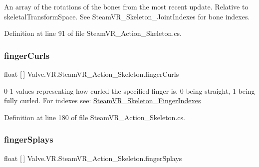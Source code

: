 An array of the rotations of the bones from the most recent update. Relative to skeletal\+Transform\+Space. See Steam\+V\+R\+\_\+\+Skeleton\+\_\+\+Joint\+Indexes for bone indexes. 



Definition at line 91 of file Steam\+V\+R\+\_\+\+Action\+\_\+\+Skeleton.\+cs.

\mbox{\label{class_valve_1_1_v_r_1_1_steam_v_r___action___skeleton_aea32ec100629c38fab02df8ad0c8437e}} 
\subsubsection{\texorpdfstring{fingerCurls}{fingerCurls}}
{\footnotesize\ttfamily float \mbox{[}$\,$\mbox{]} Valve.\+V\+R.\+Steam\+V\+R\+\_\+\+Action\+\_\+\+Skeleton.\+finger\+Curls\hspace{0.3cm}{\ttfamily [get]}}



0-\/1 values representing how curled the specified finger is. 0 being straight, 1 being fully curled. For indexes see\+: \mbox{\hyperlink{class_valve_1_1_v_r_1_1_steam_v_r___skeleton___finger_indexes}{Steam\+V\+R\+\_\+\+Skeleton\+\_\+\+Finger\+Indexes}} 



Definition at line 180 of file Steam\+V\+R\+\_\+\+Action\+\_\+\+Skeleton.\+cs.

\mbox{\label{class_valve_1_1_v_r_1_1_steam_v_r___action___skeleton_ac7eb975e0367698e976957e9f9acd8a1}} 
\subsubsection{\texorpdfstring{fingerSplays}{fingerSplays}}
{\footnotesize\ttfamily float \mbox{[}$\,$\mbox{]} Valve.\+V\+R.\+Steam\+V\+R\+\_\+\+Action\+\_\+\+Skeleton.\+finger\+Splays\hspace{0.3cm}{\ttfamily [get]}}



